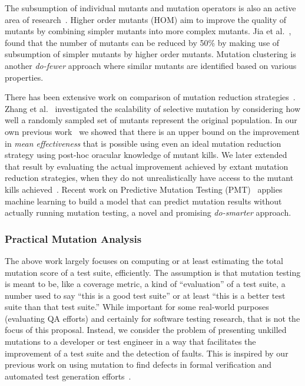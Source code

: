 The subsumption of individual mutants and mutation operators is also an active
area of research~\cite{gopinath2016measuring,shin2016theoretical,lindstrom2015redundant}.
Higher order mutants (HOM) aim to improve the quality of
mutants by combining simpler mutants into more complex mutants. Jia et
al.~\cite{jia2009higher,jia2008constructing}, found that the number of mutants
can be reduced by 50\% by making use of subsumption of simpler mutants
by higher order mutants.
Mutation clustering\cite{derezinska2015toward,strug2012machine,hussain2008mutation} is another \emph{do-fewer}
approach where similar mutants are identified based on various
properties.

There has been extensive work on comparison of mutation
reduction strategies~\cite{zhang2010isoperator,zhang2013operator}.
Zhang et al.~\cite{zhang2014an} investigated the scalability of
selective mutation by considering how well a randomly sampled set of mutants
represent the original population. 
In our own previous work~\cite{gopinath2016on} we showed that there is
an upper bound on the improvement
in \emph{mean effectiveness} that is possible using even
an ideal mutation reduction strategy using post-hoc oracular knowledge of mutant
kills. We later extended that result by evaluating the actual improvement
achieved by extant mutation reduction strategies, when they do not
unrealistically have access to the
mutant kills achieved~\cite{gopinath2017mutation}.  Recent work on Predictive 
Mutation Testing (PMT)~\cite{zhang2016predictive} applies machine 
learning to build a model that can predict mutation results without 
actually running mutation testing, a novel and promising
\emph{do-smarter} approach.



\subsubsection{Practical Mutation Analysis}

The above work largely focuses on computing or at least estimating the
total mutation score of a
test suite, efficiently.  The assumption is that mutation testing is
meant to be, like a coverage metric, a kind of ``evaluation'' of a
test suite, a number used to say ``this is a good test suite'' or at
least ``this is a better test suite than that test suite.''  While
important for some real-world purposes (evaluating QA efforts) and
certainly for software testing research, that is not the focus of this
proposal.  Instead, we consider the problem of presenting unkilled mutations to
a developer or test engineer in a way that facilitates the improvement
of a test suite and the detection of faults.  This is inspired by our
previous work on using mutation to find defects in formal verification
and automated test generation
efforts~\cite{groce2015verified,groce2018verified,mutKernel}.

